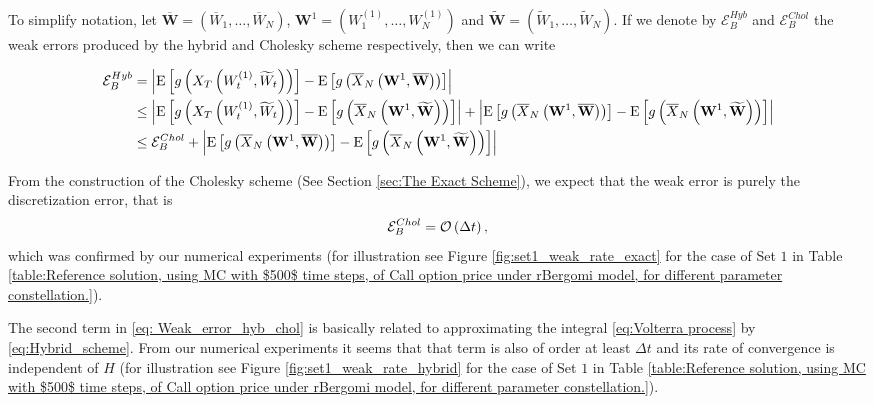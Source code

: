 To simplify notation, let  $\overline{\mathbf{W}}=(\overline{W}_1,\dots,\overline{W}_N)$, $\mathbf{W}^{1}=(W^{(1)}_1,\dots,W^{(1)}_N)$ and $\widetilde{\mathbf{W}}=(\widetilde{W}_1,\dots,\widetilde{W}_N)$. If we denote by $\mathcal{E}_{B}^{Hyb}$ and $\mathcal{E}_{B}^{Chol}$ the weak errors produced by the hybrid and Cholesky scheme respectively, then we can write
\begin{small}
\begin{align}\label{eq: Weak_error_hyb_chol}
\mathcal{E}_{B}^{Hyb}&=\left\lvert\mathrm{E}\left[g\left(X_T\left(W^{(1)}_t,\widetilde{W}_t\right) \right)\right]-\mathrm{E}\left[g\left(\overline{X}_N\left(\mathbf{W}^{1}, \overline{\mathbf{W}}\right) \right)\right]\right\rvert \nonumber\\
&\le \left\lvert\mathrm{E}\left[g\left(X_T\left(W^{(1)}_t,\widetilde{W}_t\right)\right)\right]-\mathrm{E}\left[g\left(\overline{X}_N\left(\mathbf{W}^{1}, \widetilde{\mathbf{W}}\right)\right)\right]\right\rvert+ \left\lvert \mathrm{E}\left[g\left(\overline{X}_N\left(\mathbf{W}^{1}, \overline{\mathbf{W}}\right)\right)\right]- \mathrm{E}\left[g\left(\overline{X}_N\left(\mathbf{W}^{1}, \widetilde{\mathbf{W}}\right)\right)\right]\right\rvert\nonumber\\
&\le \mathcal{E}_{B}^{Chol}+ \left\lvert \mathrm{E}\left[g\left(\overline{X}_N\left(\mathbf{W}^{1}, \overline{\mathbf{W}}\right)\right)\right]- \mathrm{E}\left[g\left(\overline{X}_N\left(\mathbf{W}^{1}, \widetilde{\mathbf{W}}\right)\right)\right]\right\rvert
\end{align}
\end{small}
From the construction of the Cholesky scheme (See Section \ref{sec:The Exact Scheme}), we expect that the weak error is purely the discretization error, that is
\begin{align*}
\mathcal{E}_{B}^{Chol}={\mathcal{O}}\left(\Delta t\right),
\end{align*}
which was confirmed by our numerical experiments (for illustration see Figure \ref{fig:set1_weak_rate_exact} for the case of Set $1$  in Table \ref{table:Reference solution, using MC with $500$ time steps, of Call option price under rBergomi model, for different parameter constellation.}). 

The second term in \eqref{eq: Weak_error_hyb_chol} is basically related to approximating the integral \eqref{eq:Volterra process}  by \eqref{eq:Hybrid_scheme}. From our numerical experiments it seems that that term is also of order at least $\Delta t$  and its rate of convergence is independent of $H$ (for illustration see Figure \ref{fig:set1_weak_rate_hybrid} for the case of Set $1$  in Table \ref{table:Reference solution, using MC with $500$ time steps, of Call option price under rBergomi model, for different parameter constellation.}).

